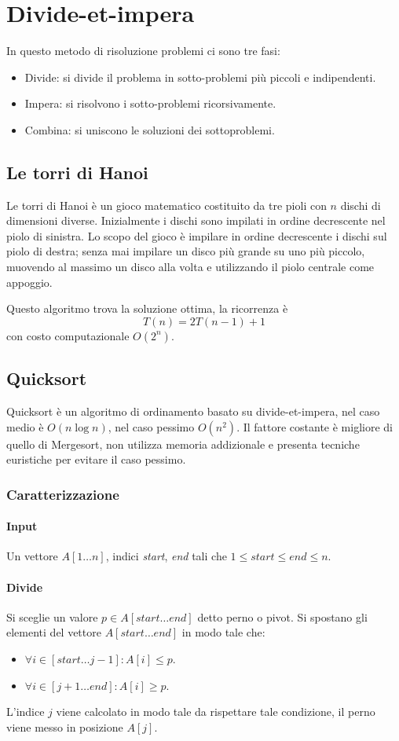 \chapter{Divide-et-impera}
In questo metodo di risoluzione problemi ci sono tre fasi: 
\begin{itemize}
\item Divide: si divide il problema in sotto-problemi pi\`u piccoli e indipendenti.
\item Impera: si risolvono i sotto-problemi ricorsivamente.
\item Combina: si uniscono le soluzioni dei sottoproblemi. 
\end{itemize}
\section{Le torri di Hanoi}
Le torri di Hanoi \`e un gioco matematico costituito da tre pioli con $n$ dischi di dimensioni diverse. Inizialmente i dischi sono impilati in ordine decrescente nel piolo di sinistra. Lo scopo del gioco \`e impilare
in ordine decrescente i dischi sul piolo di destra; senza mai impilare un disco pi\`u grande su uno pi\`u piccolo, muovendo al massimo un disco alla volta e utilizzando il piolo centrale come appoggio. 
\begin{multicols}{2}

Questo algoritmo trova la soluzione ottima, la ricorrenza \`e $$T(n) = 2T(n-1)+1$$ con costo computazionale $O(2^n)$.
\end{multicols}
\section{Quicksort}
Quicksort \`e un algoritmo di ordinamento basato su divide-et-impera, nel caso medio \`e $O(n\log n)$, nel caso pessimo $O(n^2)$. Il fattore costante \`e migliore di quello di Mergesort, non utilizza memoria
addizionale e presenta tecniche euristiche per evitare il caso pessimo.
\subsection{Caratterizzazione}
\subsubsection{Input}
Un vettore $A[1\dots n]$, indici \emph{start}, \emph{end} tali che $1\le start\le end\le n$.
\subsubsection{Divide}
Si sceglie un valore $p\in A[start\dots end]$ detto perno o pivot. Si spostano gli elementi del vettore $A[start\dots end]$ in modo tale che:
\begin{itemize}
\item $\forall i\in [start\dots j-1]: A[i]\le p$.
\item $\forall i\in [j+1\dots end]: A[i]\ge p$.
\end{itemize}
L'indice $j$ viene calcolato in modo tale da rispettare tale condizione, il perno viene messo in posizione $A[j]$. 
